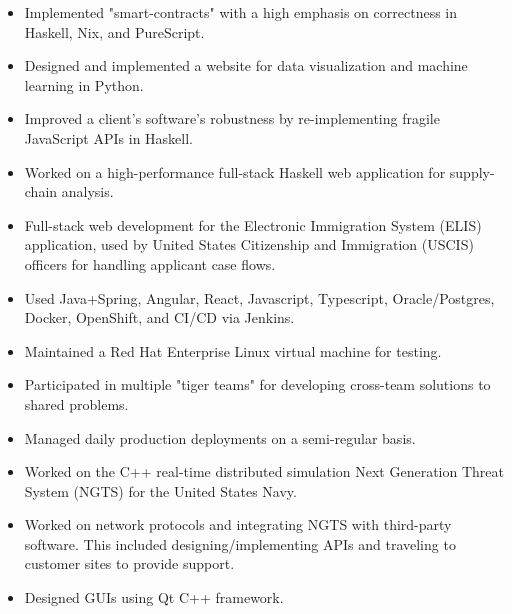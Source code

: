 \documentclass[10pt,a4paper,ragged2e,withhyper]{custom}
\begin{document}
\begin{paracol}{2}
\divider


\begin{itemize}
    \item Implemented "smart-contracts" with a high emphasis on correctness in Haskell, Nix, and PureScript.
    \item Designed and implemented a website for data visualization and machine learning in Python.
    \item Improved a client's software's robustness by re-implementing fragile JavaScript APIs in Haskell.
    \item Worked on a high-performance full-stack Haskell web application for supply-chain analysis.
\end{itemize}

\divider


\begin{itemize}
    \item Full-stack web development for the Electronic Immigration System (ELIS) application, used by United States Citizenship and Immigration (USCIS) officers for handling applicant case flows.
    \item Used Java+Spring, Angular, React, Javascript, Typescript, Oracle/Postgres, Docker, OpenShift, and CI/CD via Jenkins.
    \item Maintained a Red Hat Enterprise Linux virtual machine for testing.
    \item Participated in multiple "tiger teams" for developing cross-team solutions to shared problems.
    \item Managed daily production deployments on a semi-regular basis.
\end{itemize}

\divider

\begin{itemize}
  \item Worked on the C++ real-time distributed simulation Next Generation Threat System (NGTS) for the United States Navy.
  \item Worked on network protocols and integrating NGTS with third-party software. This included designing/implementing APIs and traveling to customer sites to provide support.
  \item Designed GUIs using Qt C++ framework.
\end{itemize}

\end{paracol}
\end{document}
